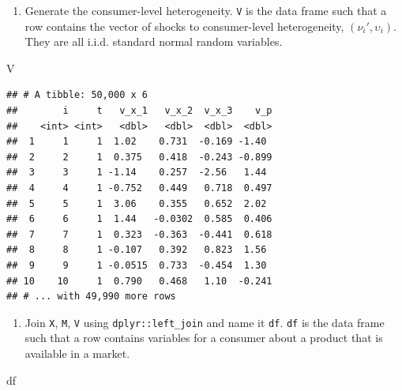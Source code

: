\documentclass[]{book}
\newenvironment{Shaded}{\begin{snugshade}}{\end{snugshade}}
\newcommand{\NormalTok}[1]{#1}
\providecommand{\tightlist}{%
  \setlength{\itemsep}{0pt}\setlength{\parskip}{0pt}}
\begin{document}
\begin{enumerate}
\def\labelenumi{\arabic{enumi}.}
\setcounter{enumi}{3}
\tightlist
\item
  Generate the consumer-level heterogeneity. \texttt{V} is the data
  frame such that a row contains the vector of shocks to consumer-level
  heterogeneity, \((\nu_{i}', \upsilon_i)\). They are all i.i.d.
  standard normal random variables.
\end{enumerate}

\begin{Shaded}
\begin{Highlighting}[]
\NormalTok{V}
\end{Highlighting}
\end{Shaded}

\begin{verbatim}
## # A tibble: 50,000 x 6
##        i     t   v_x_1   v_x_2  v_x_3    v_p
##    <int> <int>   <dbl>   <dbl>  <dbl>  <dbl>
##  1     1     1  1.02    0.731  -0.169 -1.40 
##  2     2     1  0.375   0.418  -0.243 -0.899
##  3     3     1 -1.14    0.257  -2.56   1.44 
##  4     4     1 -0.752   0.449   0.718  0.497
##  5     5     1  3.06    0.355   0.652  2.02 
##  6     6     1  1.44   -0.0302  0.585  0.406
##  7     7     1  0.323  -0.363  -0.441  0.618
##  8     8     1 -0.107   0.392   0.823  1.56 
##  9     9     1 -0.0515  0.733  -0.454  1.30 
## 10    10     1  0.790   0.468   1.10  -0.241
## # ... with 49,990 more rows
\end{verbatim}

\begin{enumerate}
\def\labelenumi{\arabic{enumi}.}
\setcounter{enumi}{4}
\tightlist
\item
  Join \texttt{X}, \texttt{M}, \texttt{V} using
  \texttt{dplyr::left\_join} and name it \texttt{df}. \texttt{df} is the
  data frame such that a row contains variables for a consumer about a
  product that is available in a market.
\end{enumerate}

\begin{Shaded}
\begin{Highlighting}[]
\NormalTok{df}
\end{Highlighting}
\end{Shaded}
\end{document}
